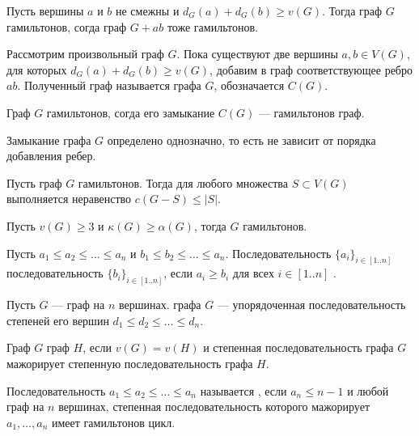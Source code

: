 \begin{lemma}
    Пусть вершины $a$ и $b$ не смежны и $d_G(a) + d_G(b) \ge v(G)$. Тогда граф $G$ гамильтонов, согда граф $G + ab$ тоже гамильтонов.
\end{lemma}

\begin{definition}[]
	Рассмотрим произвольный граф $G$. Пока существуют две вершины $a, b \in V(G)$, для которых $d_G(a) + d_G(b) \ge v(G)$, добавим в граф соответствующее ребро $ab$. Полученный граф называется  графа $G$, обозначается $C(G)$.
\end{definition}

\begin{lemma}[Хватал, 1974]
    Граф $G$ гамильтонов, согда его замыкание $C(G)$ --- гамильтонов граф.
\end{lemma}

\begin{lemma}
    Замыкание графа $G$ определено однозначно, то есть не зависит от порядка добавления ребер.
\end{lemma}

\begin{lemma}
    Пусть граф $G$ гамильтонов. Тогда для любого множества $S \subset V(G)$
	выполняется неравенство $c(G - S) \le \lvert S \rvert$.
\end{lemma}

\begin{theorem}
    Пусть $v(G) \ge 3$ и $\kappa(G) \ge \alpha(G)$, тогда $G$ гамильтонов.
\end{theorem}

\begin{definition}[]
	Пусть $a_1 \le a_2 \le \ldots \le a_{n} $ и $b_1 \le b_2 \le  \ldots \le a_{n}$. Последовательность $\{a_i\}_{i \in [1..n]}$  последовательность $\{b_i\}_{i \in [1..n]}$, если $a_i \ge b_i$ для всех $i \in [1..n]$ .
\end{definition}
\begin{definition}[]
	Пусть $G$ --- граф на $n$ вершинах.  графа $G$ --- упорядоченная последовательность степеней его вершин $d_1 \le d_2 \le \ldots \le d_{n}$.
\end{definition}
\begin{definition}[]
	Граф $G$  граф $H$, если $v(G) = v(H)$ и степенная последовательность графа $G$ мажорирует степенную последовательность графа $H$.
\end{definition}
\begin{definition}[]
	Последовательность $a_1 \le a_2 \le \ldots \le a_{n}$ называется , если $a_{n} \le n-1$ и любой граф на $n$ вершинах, степенная последовательность которого мажорирует $a_1, \ldots , a_{n}$ имеет гамильтонов цикл.
\end{definition}

